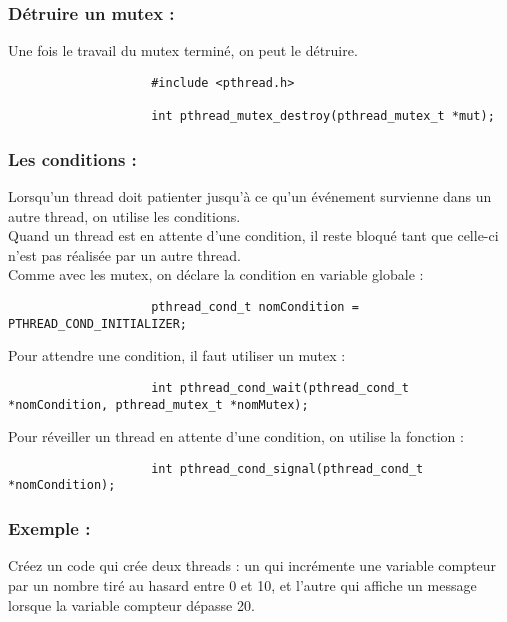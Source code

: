 			\subsubsection*{Détruire un mutex :}
				Une fois le travail du mutex terminé, on peut le détruire.
				\begin{lstlisting}
					#include <pthread.h>

					int pthread_mutex_destroy(pthread_mutex_t *mut);
				\end{lstlisting}
				
			\subsubsection*{Les conditions :}
				Lorsqu'un thread doit patienter jusqu'à ce qu'un événement survienne dans un autre thread, on utilise les conditions.\\
				Quand un thread est en attente d'une condition, il reste bloqué tant que celle-ci n'est pas réalisée par un autre thread.\\
				Comme avec les mutex, on déclare la condition en variable globale :
				\begin{lstlisting}
					pthread_cond_t nomCondition = PTHREAD_COND_INITIALIZER;
				\end{lstlisting}
				Pour attendre une condition, il faut utiliser un mutex :
				\begin{lstlisting}
					int pthread_cond_wait(pthread_cond_t *nomCondition, pthread_mutex_t *nomMutex);
				\end{lstlisting}
				Pour réveiller un thread en attente d'une condition, on utilise la fonction :
				\begin{lstlisting}
					int pthread_cond_signal(pthread_cond_t *nomCondition);
				\end{lstlisting}		
				
			\subsubsection*{Exemple :}
				Créez un code qui crée deux threads : un qui incrémente une variable compteur par un nombre tiré au hasard entre 0 et 10, et l'autre qui affiche un message lorsque la variable compteur dépasse 20.
				
